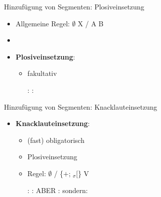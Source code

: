 
\begin{frame}{Hinzufügung von Segmenten: Plosiveinsetzung}

\begin{itemize}
	\item Allgemeine Regel: $\emptyset$ \ras X / A \underline{\quad} B
	\item[]
	\item \textbf{Plosiveinsetzung}:
	
	\begin{itemize}
		\item fakultativ
		
	\eal
		\ex {}:  \ras {}
		\ex {}:  \ras {}
	\zl
	
	\end{itemize}

\end{itemize}
\end{frame}


\begin{frame}{Hinzufügung von Segmenten: Knacklauteinsetzung}

\begin{itemize}
	\item \textbf{Knacklauteinsetzung}:

	\begin{itemize}
		\item (fast) obligatorisch
		\item Plosiveinsetzung
		\item Regel: $\emptyset$ \ras \textipa{[P]} / 
		\{$+$; \textprimstress$_\sigma [ $\} 
\underline{\quad} V

	\eal
		\ex {}:  \ras {}
		\ex {}:  \ras \textipa{[\alertred{P}a\t{pf}@l]}
		\ex ABER :  \alertblue{$\nrightarrow$}  sondern: \textipa{[\textprimstress ge:.@n]}
	\zl
	
	\end{itemize}
			
\end{itemize}

\end{frame}


